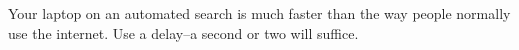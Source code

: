 \documentclass[12pt,letter]{article}
\begin{document}
Your laptop on an automated search is much faster than the way people
normally use the internet. Use a delay--a second or two will suffice. 


\pagebreak
\onehalfspacing



\pagebreak
\end{document}
